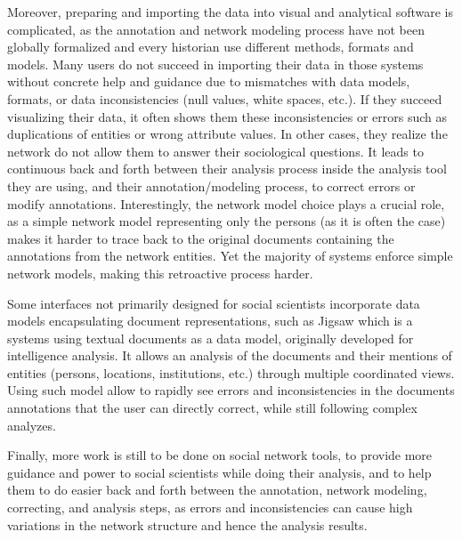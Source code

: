 
Moreover, preparing and importing the data into visual and analytical software is complicated, as the annotation and network modeling process have not been globally formalized and every historian use different methods, formats and models.
Many users do not succeed in importing their data in those systems without concrete help and guidance\cite{serranomolineroUnderstandingUseVistorian2017, alkadi2022} due to mismatches with data models, formats, or data inconsistencies (null values, white spaces, etc.).
If they succeed visualizing their data, it often shows them these inconsistencies or errors such as duplications of entities or wrong attribute values.
In other cases, they realize the network do not allow them to answer their sociological questions\cite{lemercier12FormalNetwork2015}.
It leads to continuous back and forth between their analysis process inside the analysis tool they are using, and their annotation/modeling process, to correct errors or modify annotations.
Interestingly, the network model choice plays a crucial role, as a simple network model representing only the persons (as it is often the case) makes it harder to trace back to the original documents containing the annotations from the network entities.
Yet the majority of \sna systems enforce simple network models, making this retroactive process harder.

Some interfaces not primarily designed for social scientists incorporate data models encapsulating document representations, such as Jigsaw \cite{staskoJigsawSupportingInvestigative2008} which is a \va systems using textual documents as a data model, originally developed for intelligence analysis.
It allows an analysis of the documents and their mentions of entities (persons, locations, institutions, etc.) through multiple coordinated views.
Using such model allow to rapidly see errors and inconsistencies in the documents annotations that the user can directly correct, while still following complex analyzes.

Finally, more work is still to be done on social network \va tools, to provide more guidance and power to social scientists while doing their analysis, and to help them to do easier back and forth between the annotation, network modeling, correcting, and analysis steps, as errors and inconsistencies can cause high variations in the network structure and hence the analysis results\cite{diesnerImpactEntityDisambiguation2015}.









